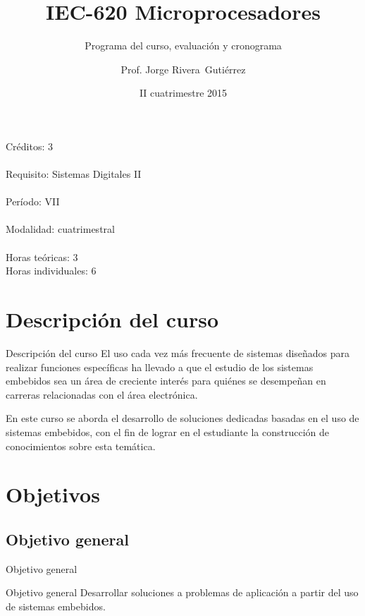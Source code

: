 \documentclass[handout,xcolor=dvipsnames]{beamer}
\title[IEC-620]{IEC-620 Microprocesadores}
\subtitle{Programa del curso, evaluación y cronograma}
\author{Prof. Jorge Rivera~Guti\'errez}
\institute{Universidad Latina de Costa Rica\\ Ingenier\'\i a en Electr\'onica}
\date{II cuatrimestre 2015}
\newcommand{\pageframe}[1]{\frame{\begin{center}{ \Huge #1 }\end{center}}}
\begin{document}
\begin{frame}
 \maketitle
\end{frame}

\begin{frame}
 \begin{center}
  \Large Créditos: 3\\~\\
  Requisito: Sistemas Digitales II\\~\\
  Período: VII\\~\\
  Modalidad: cuatrimestral\\~\\
  Horas te\'oricas: 3\\
  Horas individuales: 6
 \end{center}
\end{frame}

\section{Descripción del curso}

\begin{frame}{Descripción del curso}
 El uso cada vez más frecuente de sistemas diseñados para realizar funciones específicas ha llevado a que el estudio de los sistemas embebidos sea un área de creciente interés para quiénes se desempeñan en carreras relacionadas con el área electrónica.

En este curso se aborda el desarrollo de soluciones dedicadas basadas en el uso de sistemas embebidos, con el fin de lograr en el estudiante la construcción de conocimientos sobre esta temática.
\end{frame}

\section{Objetivos}

\pageframe{Objetivos}

\subsection{Objetivo general}

\begin{frame}{Objetivo general}
  \begin{block}{Objetivo general}
  Desarrollar soluciones a problemas de aplicación a partir del uso de sistemas embebidos.
  \end{block}
\end{frame}
\end{document}
